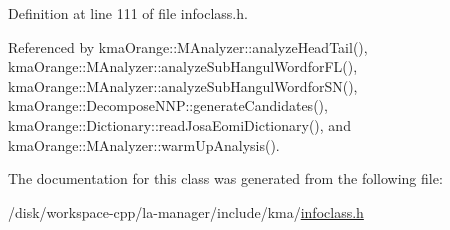 Definition at line 111 of file infoclass.h.

Referenced by kmaOrange::MAnalyzer::analyzeHeadTail(), kmaOrange::MAnalyzer::analyzeSubHangulWordforFL(), kmaOrange::MAnalyzer::analyzeSubHangulWordforSN(), kmaOrange::DecomposeNNP::generateCandidates(), kmaOrange::Dictionary::readJosaEomiDictionary(), and kmaOrange::MAnalyzer::warmUpAnalysis().

The documentation for this class was generated from the following file:\begin{CompactItemize}
\item 
/disk/workspace-cpp/la-manager/include/kma/\hyperlink{infoclass_8h}{infoclass.h}\end{CompactItemize}
